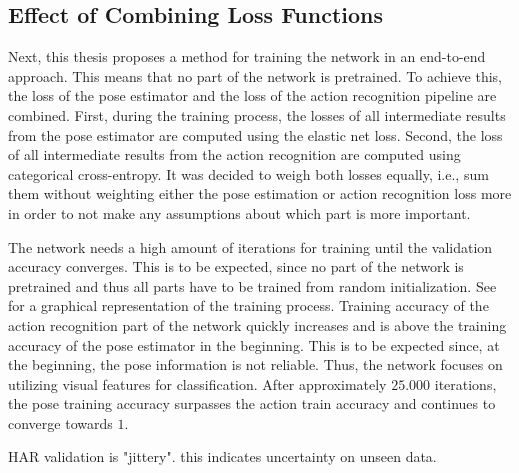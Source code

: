 

\subsection{Effect of Combining Loss Functions}
Next, this thesis proposes a method for training the network in an end-to-end approach.
This means that no part of the network is pretrained.
To achieve this, the loss of the pose estimator and the loss of the action recognition pipeline are combined.
First, during the training process, the losses of all intermediate results from the pose estimator are computed using the elastic net loss.
Second, the loss of all intermediate results from the action recognition are computed using categorical cross-entropy.
It was decided to weigh both losses equally, i.e., sum them without weighting either the pose estimation or action recognition loss more in order to not make any assumptions about which part is more important.

The network needs a high amount of iterations for training until the validation accuracy converges.
This is to be expected, since no part of the network is pretrained and thus all parts have to be trained from random initialization.
See  for a graphical representation of the training process.
Training accuracy of the action recognition part of the network quickly increases and is above the training accuracy of the pose estimator in the beginning.  
This is to be expected since, at the beginning, the pose information is not reliable.
Thus, the network focuses on utilizing visual features for classification.
After approximately $25.000$ iterations, the pose training accuracy surpasses the action train accuracy and continues to converge towards $1$.

HAR validation is "jittery". this indicates uncertainty on unseen data. 


